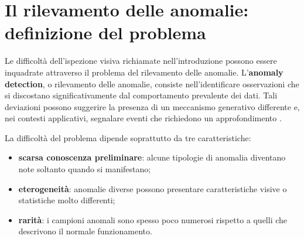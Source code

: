\chapter[Definizione del problema]{Il rilevamento delle anomalie: definizione del problema}
\label{chap:introduzione}

Le difficoltà dell'ispezione visiva richiamate nell'introduzione possono essere inquadrate attraverso il problema del rilevamento delle anomalie. L'\textbf{anomaly detection}, o rilevamento delle anomalie, consiste nell'identificare osservazioni che si discostano significativamente dal comportamento prevalente dei dati. Tali deviazioni possono suggerire la presenza di un meccanismo generativo differente e, nei contesti applicativi, segnalare eventi che richiedono un approfondimento \cite{Pang_et_al._2021}.

La difficoltà del problema dipende soprattutto da tre caratteristiche:
\begin{itemize}
    \item \textbf{scarsa conoscenza preliminare}: alcune tipologie di anomalia diventano note soltanto quando si manifestano;
    \item \textbf{eterogeneità}: anomalie diverse possono presentare caratteristiche visive o statistiche molto differenti;
    \item \textbf{rarità}: i campioni anomali sono spesso poco numerosi rispetto a quelli che descrivono il normale funzionamento.
\end{itemize}

